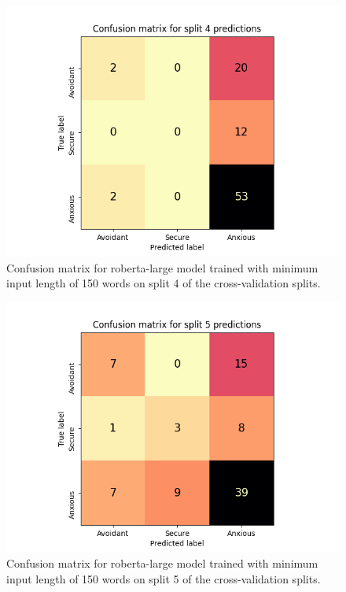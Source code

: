 \documentclass[12pt]{report}
\begin{document}
\begin{figure}
    \includegraphics[width=\textwidth]{figures/roberta-large_150_split4_confusion_matrix.png}
    \caption{Confusion matrix for roberta-large model trained with minimum input length of 150 words on split 4 of the cross-validation splits.}
    \label{fig: cm split4}
\end{figure}

\begin{figure}
    \includegraphics[width=\textwidth]{figures/roberta-large_150_split5_confusion_matrix.png}
    \caption{Confusion matrix for roberta-large model trained with minimum input length of 150 words on split 5 of the cross-validation splits.}
    \label{fig: cm split5}
\end{figure}
    
\end{document}
